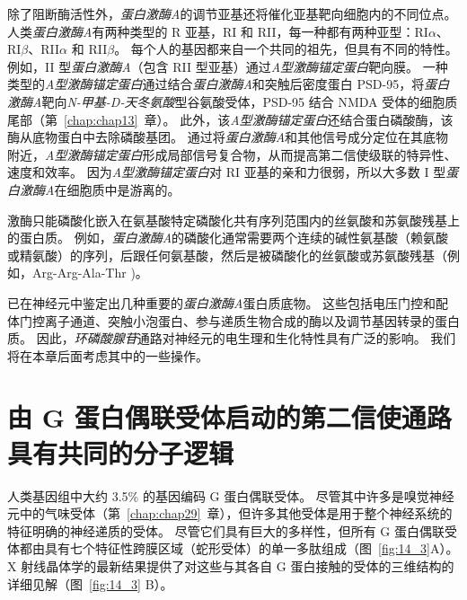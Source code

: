 除了阻断酶活性外，\textit{蛋白激酶A}的调节亚基还将催化亚基靶向细胞内的不同位点。
人类\textit{蛋白激酶A}有两种类型的 R 亚基，RI 和 RII，每一种都有两种亚型：RI$\alpha$、RI$\beta$、RII$\alpha$ 和 RII$\beta$。
每个人的基因都来自一个共同的祖先，但具有不同的特性。
例如，II 型\textit{蛋白激酶A}（包含 RII 型亚基）通过\textit{A型激酶锚定蛋白}靶向膜。
一种类型的\textit{A型激酶锚定蛋白}通过结合\textit{蛋白激酶A}和突触后密度蛋白 PSD-95，将\textit{蛋白激酶A}靶向\textit{N-甲基-D-天冬氨酸}型谷氨酸受体，PSD-95 结合 NMDA 受体的细胞质尾部（第~\ref{chap:chap13}~章）。
此外，该\textit{A型激酶锚定蛋白}还结合蛋白磷酸酶，该酶从底物蛋白中去除磷酸基团。
通过将\textit{蛋白激酶A}和其他信号成分定位在其底物附近，\textit{A型激酶锚定蛋白}形成局部信号复合物，从而提高第二信使级联的特异性、速度和效率。
因为\textit{A型激酶锚定蛋白}对 RI 亚基的亲和力很弱，所以大多数 I 型\textit{蛋白激酶A}在细胞质中是游离的。


激酶只能磷酸化嵌入在氨基酸特定磷酸化共有序列范围内的丝氨酸和苏氨酸残基上的蛋白质。
例如，\textit{蛋白激酶A}的磷酸化通常需要两个连续的碱性氨基酸（赖氨酸或精氨酸）的序列，后跟任何氨基酸，然后是被磷酸化的丝氨酸或苏氨酸残基（例如，Arg-Arg-Ala-Thr )。


已在神经元中鉴定出几种重要的\textit{蛋白激酶A}蛋白质底物。
这些包括电压门控和配体门控离子通道、突触小泡蛋白、参与递质生物合成的酶以及调节基因转录的蛋白质。
因此，\textit{环磷酸腺苷}通路对神经元的电生理和生化特性具有广泛的影响。
我们将在本章后面考虑其中的一些操作。



\section{由 G 蛋白偶联受体启动的第二信使通路具有共同的分子逻辑}

人类基因组中大约 3.5\% 的基因编码 G 蛋白偶联受体。
尽管其中许多是嗅觉神经元中的气味受体（第~\ref{chap:chap29}~章），但许多其他受体是用于整个神经系统的特征明确的神经递质的受体。
尽管它们具有巨大的多样性，但所有 G 蛋白偶联受体都由具有七个特征性跨膜区域（蛇形受体）的单一多肽组成（图~\ref{fig:14_3}A）。
X 射线晶体学的最新结果提供了对这些与其各自 G 蛋白接触的受体的三维结构的详细见解（图~\ref{fig:14_3} B）。


